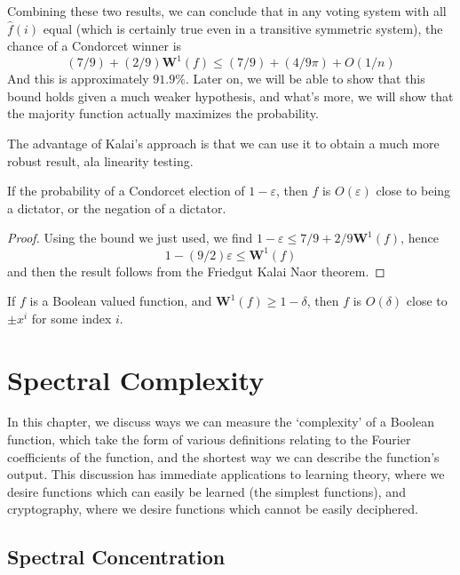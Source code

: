 Combining these two results, we can conclude that in any voting system with all $\widehat{f}(i)$ equal (which is certainly true even in a transitive symmetric system), the chance of a Condorcet winner is
%
\[ (7/9) + (2/9) \mathbf{W}^1(f) \leq (7/9) + (4/9\pi) + O(1/n) \]
%
And this is approximately $91.9\%$. Later on, we will be able to show that this bound holds given a much weaker hypothesis, and what's more, we will show that the majority function actually maximizes the probability.

The advantage of Kalai's approach is that we can use it to obtain a much more robust result, ala linearity testing.

\begin{theorem}
    If the probability of a Condorcet election of $1 - \varepsilon$, then $f$ is $O(\varepsilon)$ close to being a dictator, or the negation of a dictator.
\end{theorem}
\begin{proof}
    Using the bound we just used, we find $1 - \varepsilon \leq 7/9 + 2/9 \mathbf{W}^1(f)$, hence
    \[ 1 - (9/2) \varepsilon \leq \mathbf{W}^1(f) \]
    and then the result follows from the Friedgut Kalai Naor theorem.
\end{proof}

\begin{theorem}
    If $f$ is a Boolean valued function, and $\mathbf{W}^1(f) \geq 1 - \delta$, then $f$ is $O(\delta)$ close to $\pm x^i$ for some index $i$.
\end{theorem}








\chapter{Spectral Complexity}

In this chapter, we discuss ways we can measure the `complexity' of a Boolean function, which take the form of various definitions relating to the Fourier coefficients of the function, and the shortest way we can describe the function's output. This discussion has immediate applications to learning theory, where we desire functions which can easily be learned (the simplest functions), and cryptography, where we desire functions which cannot be easily deciphered.

\section{Spectral Concentration}

